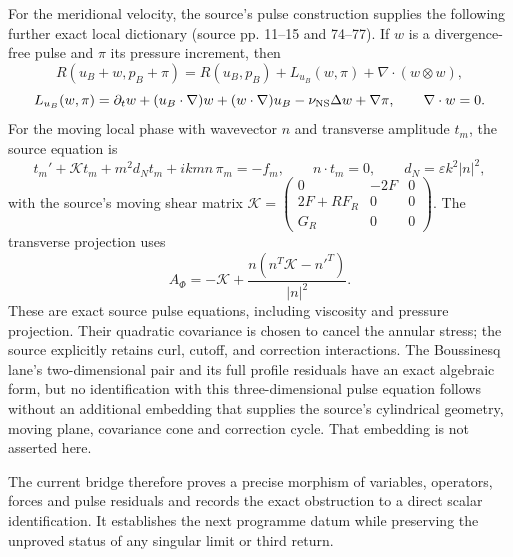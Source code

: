 For the meridional velocity, the source's pulse construction supplies the
following further exact local dictionary (source pp. 11--15 and 74--77). If
$w$ is a divergence-free pulse and $\pi$ its pressure increment, then
\[
 R(u_B+w,p_B+\pi)=R(u_B,p_B)+L_{u_B}(w,\pi)
 +\nabla\!\cdot(w\otimes w),
\]
\[
 L_{u_B}(w,\pi)=\partial_tw+(u_B\cdot\nabla)w
 +(w\cdot\nabla)u_B-\nu_{\rm NS}\Delta w+\nabla\pi,
 \qquad \nabla\cdot w=0.
\]
For the moving local phase with wavevector $n$ and transverse amplitude
$t_m$, the source equation is
\[
 t_m'+\mathcal Kt_m+m^2d_N t_m+i k m n\,\pi_m=-f_m,
 \qquad n\cdot t_m=0,
 \qquad d_N=\varepsilon k^2|n|^2,
\]
with the source's moving shear matrix
$\mathcal K=\begin{pmatrix}0&-2F&0\\2F+RF_R&0&0\\G_R&0&0\end{pmatrix}$.
The transverse projection uses
\[
 A_\Phi=-\mathcal K+
 \frac{n(n^T\mathcal K-n'^T)}{|n|^2}.
\]
These are exact source pulse equations, including viscosity and pressure
projection. Their quadratic covariance is chosen to cancel the annular
stress; the source explicitly retains curl, cutoff, and correction interactions.
The Boussinesq lane's two-dimensional pair and its full profile residuals have
an exact algebraic form, but no identification with this three-dimensional
pulse equation follows without an additional embedding that supplies the
source's cylindrical geometry, moving plane, covariance cone and correction
cycle. That embedding is not asserted here.

The current bridge therefore proves a precise morphism of variables, operators,
forces and pulse residuals and records the exact obstruction to a direct scalar
identification. It establishes the next programme datum while preserving the
unproved status of any singular limit or third return.


\sloppy

